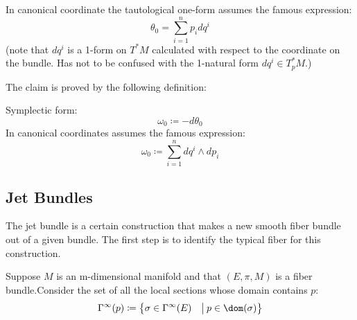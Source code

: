 \documentclass[Main]{subfiles}
\begin{document}
					\begin{observation}
						In canonical coordinate the tautological one-form assumes the famous expression:
						\begin{displaymath}
							\theta_0 = \sum_{i=1}^n {p_i} d q^i
						\end{displaymath}
						(note that $d q^i$ is a 1-form on $T^*M$ calculated with respect to the coordinate on the bundle. Has not to be confused with the 1-natural form $d q^i \in T^*_p M$.)
					\end{observation}
	
					The claim is proved by the following definition:
					\begin{definition}\label{Def:NatSymForm}
						Symplectic form:
						\begin{displaymath}
							\omega_0 \coloneqq -d \theta_0
						\end{displaymath}
						In canonical coordinates assumes the famous expression:
						\begin{displaymath}
							\omega_0 \coloneqq \sum_{i=1}^n  d q^i \wedge d p_i
						\end{displaymath}
					\end{definition}
					
		\subsection{Jet Bundles}
			The jet bundle is a certain construction that makes a new smooth fiber bundle out of a given bundle. The first step is to identify the typical fiber for this construction.

			Suppose $M$ is an m-dimensional manifold and that $(E, \pi, M)$ is a fiber bundle.Consider the set of all the local sections whose domain contains $p$:
			\begin{displaymath}
				\Gamma^\infty (p) \coloneqq \big\{ \sigma \in \Gamma^\infty(E) \quad \big\vert\:  p \in \dom(\sigma)  \big\}
			\end{displaymath}
\end{document}
